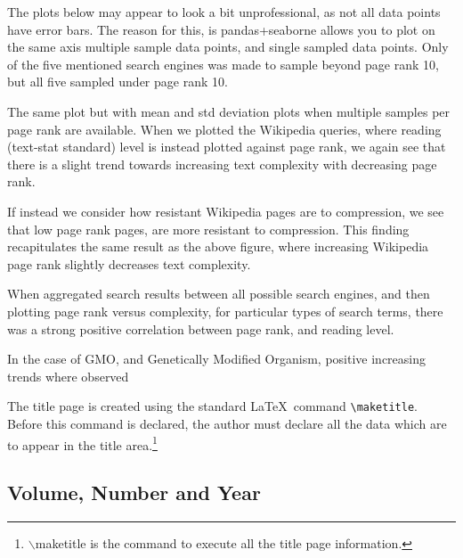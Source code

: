 \documentclass{clv3}
\begin{document}

%

The plots below may appear to look a bit unprofessional, as not all data points have error bars. The reason for this, is pandas+seaborne allows you to plot on the same axis multiple sample data points, and single sampled data points. Only of the five mentioned search engines was made to sample beyond page rank 10, but all five sampled under page rank 10.

%

The same plot but with mean and std deviation plots when multiple samples per page rank are available. When we plotted the Wikipedia queries, where reading (text-stat standard) level is instead plotted against page rank, we again see that there is a slight trend towards increasing text complexity with decreasing page rank. 


If instead we consider how resistant Wikipedia pages are to compression, we see that low page rank pages, are more resistant to compression. This finding recapitulates the same result as the above figure, where increasing Wikipedia page rank slightly decreases text complexity.

When aggregated search results between all possible search engines, and then plotting page rank versus complexity, for particular types of search terms, there was a strong positive correlation between page rank, and reading level.

In the case of GMO, and Genetically Modified Organism, positive increasing trends where observed

The title page is created using the standard \LaTeX\ command \verb|\maketitle|.
Before this command is declared, the author must declare all the data which are
to appear in the title area.\footnote{$\backslash$maketitle is the command to execute all the title page information.}

\subsection{Volume, Number and Year}
\end{document}
